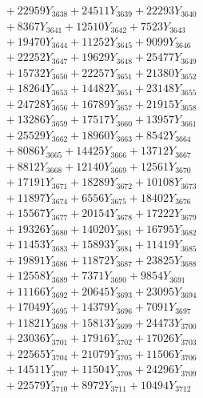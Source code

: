 \documentclass[a4paper,10pt]{article}
\begin{document}
{\begin{align}
&\;  + 22959 Y_{3638} + 24511 Y_{3639} + 22293 Y_{3640} \\[0.3ex]
&\;  + 8367 Y_{3641} + 12510 Y_{3642} + 7523 Y_{3643} \\[0.3ex]
&\;  + 19470 Y_{3644} + 11252 Y_{3645} + 9099 Y_{3646} \\[0.3ex]
&\;  + 22252 Y_{3647} + 19629 Y_{3648} + 25477 Y_{3649} \\[0.3ex]
&\;  + 15732 Y_{3650} + 22257 Y_{3651} + 21380 Y_{3652} \\[0.3ex]
&\;  + 18264 Y_{3653} + 14482 Y_{3654} + 23148 Y_{3655} \\[0.3ex]
&\;  + 24728 Y_{3656} + 16789 Y_{3657} + 21915 Y_{3658} \\[0.5ex]\allowbreak
&\;  + 13286 Y_{3659} + 17517 Y_{3660} + 13957 Y_{3661} \\[0.3ex]
&\;  + 25529 Y_{3662} + 18960 Y_{3663} + 8542 Y_{3664} \\[0.3ex]
&\;  + 8086 Y_{3665} + 14425 Y_{3666} + 13712 Y_{3667} \\[0.3ex]
&\;  + 8812 Y_{3668} + 12140 Y_{3669} + 12561 Y_{3670} \\[0.3ex]
&\;  + 17191 Y_{3671} + 18289 Y_{3672} + 10108 Y_{3673} \\[0.3ex]
&\;  + 11897 Y_{3674} + 6556 Y_{3675} + 18402 Y_{3676} \\[0.3ex]
&\;  + 15567 Y_{3677} + 20154 Y_{3678} + 17222 Y_{3679} \\[0.3ex]
&\;  + 19326 Y_{3680} + 14020 Y_{3681} + 16795 Y_{3682} \\[0.3ex]
&\;  + 11453 Y_{3683} + 15893 Y_{3684} + 11419 Y_{3685} \\[0.3ex]
&\;  + 19891 Y_{3686} + 11872 Y_{3687} + 23825 Y_{3688} \\[0.5ex]\allowbreak
&\;  + 12558 Y_{3689} + 7371 Y_{3690} + 9854 Y_{3691} \\[0.3ex]
&\;  + 11166 Y_{3692} + 20645 Y_{3693} + 23095 Y_{3694} \\[0.3ex]
&\;  + 17049 Y_{3695} + 14379 Y_{3696} + 7091 Y_{3697} \\[0.3ex]
&\;  + 11821 Y_{3698} + 15813 Y_{3699} + 24473 Y_{3700} \\[0.3ex]
&\;  + 23036 Y_{3701} + 17916 Y_{3702} + 17026 Y_{3703} \\[0.3ex]
&\;  + 22565 Y_{3704} + 21079 Y_{3705} + 11506 Y_{3706} \\[0.3ex]
&\;  + 14511 Y_{3707} + 11504 Y_{3708} + 24296 Y_{3709} \\[0.3ex]
&\;  + 22579 Y_{3710} + 8972 Y_{3711} + 10494 Y_{3712} \\[0.3ex]

\end{align}}
\end{document}
